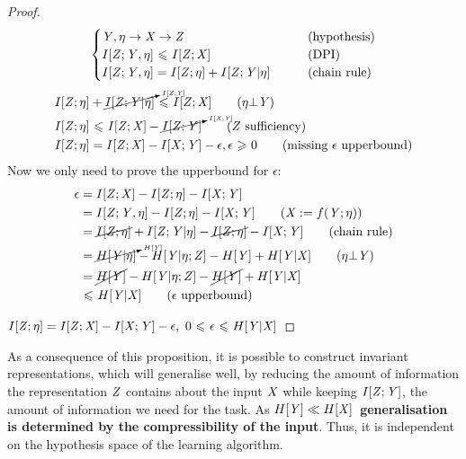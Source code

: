 \begin{proof}
	\begin{align*}
    \begin{cases}
    {\mathit{Y}}, {\mathit{\eta}} \to {\mathit{X}} \to {\mathit{Z}} \qquad &\text{(hypothesis)}\\
    I[{\mathit{Z}};{\mathit{Y}},{\mathit{\eta}}] {~\leqslant ~} I[{\mathit{Z}};{\mathit{X}}] \qquad &\text{(DPI)}\\
    I[{\mathit{Z}};{\mathit{Y}},{\mathit{\eta}}] = I[{\mathit{Z}};{\mathit{\eta}}] + I[{\mathit{Z}};{\mathit{Y}}|{\mathit{\eta}}] \qquad &\text{(chain rule)}
    \end{cases}
    \end{align*}
    \begin{align}
    &I[\rvZ;\rvN] + \cancelto{\scriptscriptstyle \IZY}{I[\rvZ;\rvY|\rvN]} \leq I[\rvZ;\rvX] \tag{$\rvN \ind \rvY$}\\
    &I[\rvZ;\rvN] \leq I[\rvZ;\rvX] - \cancelto{\scriptscriptstyle \IXY}{\IZY} \tag{$\rvZ$ sufficiency}\\
    &I[\rvZ;\rvN] = I[\rvZ;\rvX] - \IXY -\epsilon, \epsilon \geq 0 \tag{missing $\epsilon$ upperbound}
    \end{align}
Now we only need to prove the upperbound for $\epsilon$:
\begin{align}
    \epsilon &= \IZX - I[\rvZ;\rvN] - \IXY \nonumber\\
     &= I[\rvZ;\rvY,\rvN] - I[\rvZ;\rvN] - \IXY \tag{$\rvX:=f(\rvY; \rvN)$}\\
     &= \cancel{I[\rvZ;\rvN]} + I[\rvZ;\rvY|\rvN] - \cancel{I[\rvZ;\rvN]}- \IXY \tag{chain rule}\\
     &= \cancelto{\scriptscriptstyle H[\rvY]}{H[\rvY|\rvN]} - H[\rvY|\rvN;\rvZ] - H[\rvY] + H[\rvY|\rvX] \tag{$\rvN \ind \rvY$}\\
     &= \cancel{H[\rvY]} - H[\rvY|\rvN;\rvZ] - \cancel{H[\rvY]} + H[\rvY|\rvX] \nonumber\\
     &\leq  H[\rvY|\rvX] \tag{$\epsilon$ upperbound}
\end{align}

$I[{\mathit{Z}};{\mathit{\eta}}] = I[{\mathit{Z}};{\mathit{X}}] - I[{{\mathit{X}}};{{\mathit{Y}}}] -\epsilon, ~0 {~\leqslant ~} \epsilon {~\leqslant ~} H[{\mathit{Y}}|{\mathit{X}}]$\end{proof}

As a consequence of this proposition, it is possible to construct invariant representations, which will generalise well, by reducing the amount of information the representation ${\mathit{Z}}$ contains about the input ${\mathit{X}}$ while keeping $I[{{\mathit{Z}}};{{\mathit{Y}}}]$, the amount of information we need for the task. As $H[{\mathit{Y}}] \ll H[{\mathit{X}}]$~\textbf{generalisation is determined by the compressibility of the input}. Thus, it is independent on the hypothesis space of the learning algorithm.

